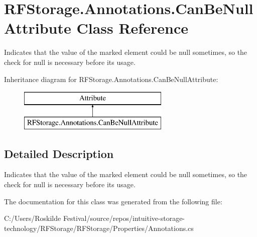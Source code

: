 \hypertarget{class_r_f_storage_1_1_annotations_1_1_can_be_null_attribute}{}\section{R\+F\+Storage.\+Annotations.\+Can\+Be\+Null\+Attribute Class Reference}
\label{class_r_f_storage_1_1_annotations_1_1_can_be_null_attribute}


Indicates that the value of the marked element could be {\ttfamily null} sometimes, so the check for {\ttfamily null} is necessary before its usage.  


Inheritance diagram for R\+F\+Storage.\+Annotations.\+Can\+Be\+Null\+Attribute\+:\begin{figure}[H]
\begin{center}
\leavevmode
\includegraphics[height=2.000000cm]{class_r_f_storage_1_1_annotations_1_1_can_be_null_attribute}
\end{center}
\end{figure}


\subsection{Detailed Description}
Indicates that the value of the marked element could be {\ttfamily null} sometimes, so the check for {\ttfamily null} is necessary before its usage. 


\begin{DoxyCode}{0}
\DoxyCodeLine{}
\DoxyCodeLine{\}}
\end{DoxyCode}


The documentation for this class was generated from the following file\+:\begin{DoxyCompactItemize}
\item 
C\+:/\+Users/\+Roskilde Festival/source/repos/intuitive-\/storage-\/technology/\+R\+F\+Storage/\+R\+F\+Storage/\+Properties/Annotations.\+cs\end{DoxyCompactItemize}
